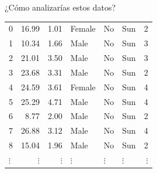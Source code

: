 \documentclass[aspectratio=169, usenames,dvipsnames]{beamer}
\begin{document}
\begin{frame}{}
    \begin{center}
        \Large{¿Cómo analizarías estos datos?}
    \end{center}

    \centering
    \begin{tabular}{lrrlllr}
    \midrule
    0 & 16.99 & 1.01 & Female & No & Sun & 2 \\
    1 & 10.34 & 1.66 & Male & No & Sun & 3 \\
    2 & 21.01 & 3.50 & Male & No & Sun & 3 \\
    3 & 23.68 & 3.31 & Male & No & Sun & 2 \\
    4 & 24.59 & 3.61 & Female & No & Sun & 4 \\
    5 & 25.29 & 4.71 & Male & No & Sun & 4 \\
    6 & 8.77 & 2.00 & Male & No & Sun & 2 \\
    7 & 26.88 & 3.12 & Male & No & Sun & 4 \\
    8 & 15.04 & 1.96 & Male & No & Sun & 2 \\
    $\vdots$ & $\vdots$ & $\vdots$ & $\vdots$ & $\vdots$ & $\vdots$ & $\vdots$ \\
    \end{tabular}

    \pause 

\end{frame}
\end{document}
